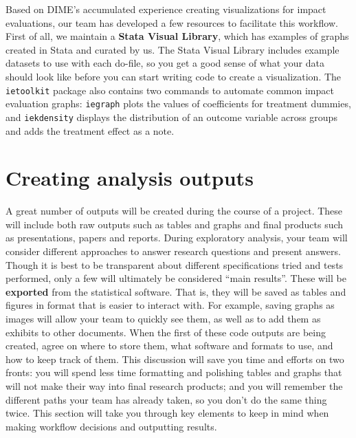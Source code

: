 Based on DIME's accumulated experience creating visualizations for impact evaluations,
our team has developed a few resources to facilitate this workflow.
First of all, we maintain a \textbf{Stata Visual Library},
which has examples of graphs created in Stata and curated by us.
The Stata Visual Library includes example datasets to use with each do-file,
so you get a good sense of what your data should look like
before you can start writing code to create a visualization.
The \texttt{ietoolkit} package also contains two commands to automate
common impact evaluation graphs:
\texttt{iegraph} plots the values of coefficients for treatment dummies,
and \texttt{iekdensity} displays the distribution of an outcome variable
across groups and adds the treatment effect as a note.


\section{Creating analysis outputs}

A great number of outputs will be created during the course of a project.
These will include both raw outputs such as tables and graphs
and final products such as presentations, papers and reports.
During exploratory analysis, your team will consider different approaches
to answer research questions and present answers.
Though it is best to be transparent about different
specifications tried and tests performed,
only a few will ultimately be considered ``main results''.
These will be \textbf{exported}
from the statistical software.
That is, they will be saved as tables and figures in format that is easier to interact with.
For example, saving graphs as images will allow your team to quickly see them,
as well as to add them as exhibits to other documents.
When the first of these code outputs are being created, agree on where to store them,
what software and formats to use, and how to keep track of them.
This discussion will save you time and efforts on two fronts:
you will spend less time formatting and polishing tables and graphs that
will not make their way into final research products;
and you will remember the different paths your team has already
taken, so you don't do the same thing twice.
This section will take you through key elements to keep in mind
when making workflow decisions and outputting results.


